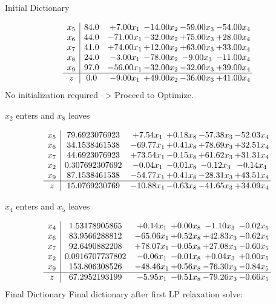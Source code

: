 \documentclass[8pt]{article}
\begin{document}
Initial Dictionary 

\[\begin{array}{c| c c@{\hskip 2pt} c@{\hskip 2pt} c@{\hskip 2pt} c@{\hskip 2pt} }
 x_{5}   &  84.0 & +  7.00 x_{1} & -14.00 x_{2} & -59.00 x_{3} & -54.00 x_{4}\\
 x_{6}   &  44.0 & -71.00 x_{1} & -32.00 x_{2} & + 75.00 x_{3} & + 28.00 x_{4}\\
 x_{7}   &  41.0 & + 74.00 x_{1} & + 12.00 x_{2} & + 63.00 x_{3} & + 33.00 x_{4}\\
 x_{8}   &  24.0 & -3.00 x_{1} & -78.00 x_{2} & -9.00 x_{3} & -11.00 x_{4}\\
 x_{9}   &  97.0 & -56.00 x_{1} & -32.00 x_{2} & -32.00 x_{3} & + 39.00 x_{4}\\
\hline
z    &  0.0 & -9.00 x_{1} & + 49.00 x_{2} & -36.00 x_{3} & + 41.00 x_{4}\\
\end{array}\]
No initialization required --> Proceed to Optimize. 


 $ x_{2} $ enters and $ x_{8} $ leaves 

 \[\begin{array}{c| c c@{\hskip 2pt} c@{\hskip 2pt} c@{\hskip 2pt} c@{\hskip 2pt} }
 x_{5}   &  79.6923076923 & +  7.54 x_{1} & +  0.18 x_{8} & -57.38 x_{3} & -52.03 x_{4}\\
 x_{6}   &  34.1538461538 & -69.77 x_{1} & +  0.41 x_{8} & + 78.69 x_{3} & + 32.51 x_{4}\\
 x_{7}   &  44.6923076923 & + 73.54 x_{1} & -0.15 x_{8} & + 61.62 x_{3} & + 31.31 x_{4}\\
 x_{2}   &  0.307692307692 & -0.04 x_{1} & -0.01 x_{8} & -0.12 x_{3} & -0.14 x_{4}\\
 x_{9}   &  87.1538461538 & -54.77 x_{1} & +  0.41 x_{8} & -28.31 x_{3} & + 43.51 x_{4}\\
\hline
z    &  15.0769230769 & -10.88 x_{1} & -0.63 x_{8} & -41.65 x_{3} & + 34.09 x_{4}\\
\end{array}\]


 $ x_{4} $ enters and $ x_{5} $ leaves 

 \[\begin{array}{c| c c@{\hskip 2pt} c@{\hskip 2pt} c@{\hskip 2pt} c@{\hskip 2pt} }
 x_{4}   &  1.53178905865 & +  0.14 x_{1} & +  0.00 x_{8} & -1.10 x_{3} & -0.02 x_{5}\\
 x_{6}   &  83.9566288812 & -65.06 x_{1} & +  0.52 x_{8} & + 42.83 x_{3} & -0.62 x_{5}\\
 x_{7}   &  92.6490882208 & + 78.07 x_{1} & -0.05 x_{8} & + 27.08 x_{3} & -0.60 x_{5}\\
 x_{2}   &  0.0916707737802 & -0.06 x_{1} & -0.01 x_{8} & +  0.04 x_{3} & +  0.00 x_{5}\\
 x_{9}   &  153.806308526 & -48.46 x_{1} & +  0.56 x_{8} & -76.30 x_{3} & -0.84 x_{5}\\
\hline
z    &  67.2952193199 & -5.95 x_{1} & -0.51 x_{8} & -79.26 x_{3} & -0.66 x_{5}\\
\end{array}\]
Final Dictionary
Final dictionary after first LP relaxation solve: 
\end{document}
